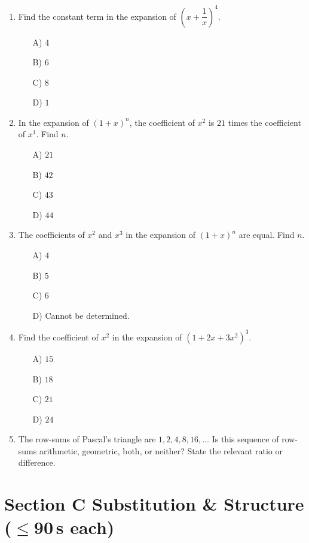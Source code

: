 \documentclass[11pt,a4paper]{article}
\begin{document}
\begin{enumerate}
\item Find the constant term in the expansion of $\left(x+\dfrac1x\right)^4$.
\begin{itemize}
\item[A)] $4$
\item[B)] $6$
\item[C)] $8$
\item[D)] $1$
\end{itemize}

\item In the expansion of $(1+x)^n$, the coefficient of $x^2$ is $21$ times the coefficient of $x^1$. Find $n$.
\begin{itemize}
\item[A)] $21$
\item[B)] $42$
\item[C)] $43$
\item[D)] $44$
\end{itemize}

\item The coefficients of $x^2$ and $x^3$ in the expansion of $(1+x)^n$ are equal. Find $n$.
\begin{itemize}
\item[A)] $4$
\item[B)] $5$
\item[C)] $6$
\item[D)] Cannot be determined.
\end{itemize}

\item Find the coefficient of $x^2$ in the expansion of $(1+2x+3x^2)^3$.
\begin{itemize}
\item[A)] $15$
\item[B)] $18$
\item[C)] $21$
\item[D)] $24$
\end{itemize}

\item The row-sums of Pascal's triangle are $1,2,4,8,16,\ldots$ Is this sequence of row-sums arithmetic, geometric, both, or neither? State the relevant ratio or difference.

\end{enumerate}

\section*{Section C \quad Substitution \& Structure \hfill{\normalfont\small($\leq$90\,s each)}}
\end{document}

